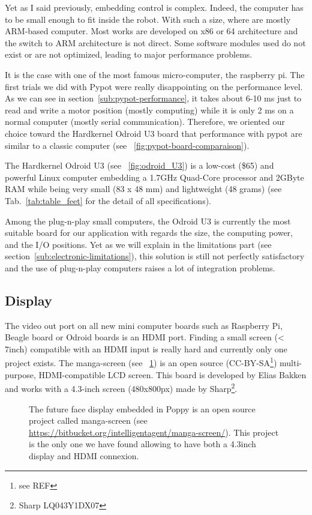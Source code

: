 Yet as I said previously, embedding control is complex. Indeed, the computer has to be small enough to fit inside the robot. With such a size, where are mostly ARM-based computer. Most works are developed on x86 or 64 architecture and the switch to ARM architecture is not direct. Some software modules used do not exist or are not optimized, leading to major performance problems.

It is the case with one of the most famous micro-computer, the raspberry pi. The first trials we did with Pypot were really disappointing on the performance level. As we can see in section~\ref{sub:pypot-performance}, it takes about 6-10 ms just to read and write a motor position (mostly computing) while it is only 2 ms on a normal computer (mostly serial communication). Therefore, we oriented our choice toward the Hardkernel Odroid U3 board that performance with pypot are similar to a classic computer (see \figurename~\ref{fig:pypot-board-comparaison}).


The Hardkernel Odroid U3 (see \figurename~\ref{fig:odroid_U3}) is a low-cost (\$65) and powerful Linux computer embedding a 1.7GHz Quad-Core processor and 2GByte RAM while being very small (83 x 48 mm) and lightweight (48 grams) (see Tab.~\ref{tab:table_feet} for the detail of all specifications).


Among the plug-n-play small computers, the Odroid U3 is currently the most suitable board for our application with regards the size, the computing power, and the I/O positions.
Yet as we will explain in the limitations part (see section~\ref{sub:electronic-limitations}), this solution is still not perfectly satisfactory and the use of plug-n-play computers raises a lot of integration problems.

\subsection{Display} %

The video out port on all new mini computer boards such as Raspberry Pi, Beagle board or Odroid boards is an HDMI port. Finding a small screen (< 7inch) compatible with an HDMI input is really hard and currently only one project exists. The manga-screen (see \figurename~\ref{fig:manga-screen}) is an open source (CC-BY-SA\footnote{see REF}) multi-purpose, HDMI-compatible LCD screen. This board is developed by Elias Bakken and works with a 4.3-inch screen (480x800px) made by Sharp\footnote{Sharp LQ043Y1DX07}.

\begin{figure}[ht]
\centering
    \hfil
    \caption{The future face display embedded in Poppy is an open source project called manga-screen (see \url{https://bitbucket.org/intelligentagent/manga-screen/}). This project is the only one we have found allowing to have both a 4.3inch display and HDMI connexion.}
    \label{fig:manga-screen}
\end{figure}

